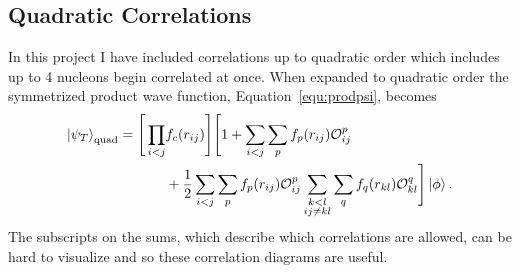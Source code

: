 \subsection{Quadratic Correlations}
In this project I have included correlations up to quadratic order which includes up to 4 nucleons begin correlated at once. When expanded to quadratic order the symmetrized product wave function, Equation~\ref{equ:prodpsi}, becomes
\begin{equation}
   \begin{split}
      \left| \psi_T \right>_\text{quad} = \Bigg[\prod\limits_{i<j}&f_c(r_{ij})\Bigg] \Bigg[1+\sum\limits_{i<j}\sum\limits_p f_p(r_{ij})\mathcal{O}_{ij}^p \\
         & + \frac{1}{2}\sum\limits_{i<j}\sum\limits_p f_p(r_{ij})\mathcal{O}_{ij}^p\sum_{\substack{k<l\\ij \ne kl}}\sum\limits_q f_q(r_{kl})\mathcal{O}_{kl}^q \Bigg] \left| \phi \right>.
   \end{split}
   \label{equ:fullquadcorr}
\end{equation}
The subscripts on the sums, which describe which correlations are allowed, can be hard to visualize and so these correlation diagrams are useful.

